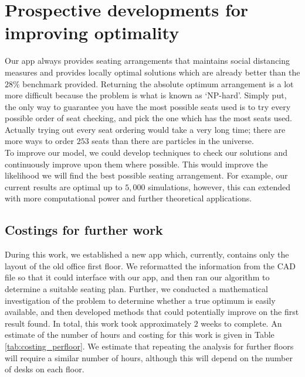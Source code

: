 \documentclass[11pt,a4paper]{article}
\begin{document}
\section*{Prospective developments for improving optimality}
Our app always provides seating arrangements that maintains social distancing measures and provides locally optimal solutions which are already better than the $28\%$ benchmark provided. Returning the  absolute optimum arrangement is a lot more difficult because the problem is what is known as `NP-hard'.  Simply put, the only way to guarantee you have the most possible seats used is to try every possible order of seat checking, and pick the one which has the most seats used. Actually trying out every seat ordering would take a very long time; there are more ways to order $253$ seats than there are particles in the universe.\\

To improve our model, we could develop techniques to check our solutions and continuously improve upon them where possible. This would improve the likelihood we will find the best possible seating arrangement. For example, our current results are optimal up to $5,000$ simulations, however, this can extended with more computational power and further theoretical applications.\\


\subsection*{Costings for further work}
During this work, we established a new app which, currently, contains only the layout of the old office first floor. We reformatted the information from the CAD file so that it could interface with our app, and then ran our algorithm to determine a suitable seating plan. Further, we conducted a mathematical investigation of the problem to determine whether a true optimum is easily available, and then developed methods that could potentially improve on the first result found. In total, this work took approximately $2$ weeks to complete. An estimate of the number of hours and costing for this work is given in Table \ref{tab:costing_perfloor}. We estimate that repeating the analysis for further floors will require a similar number of hours, although this will depend on the number of desks on each floor.
\end{document}
